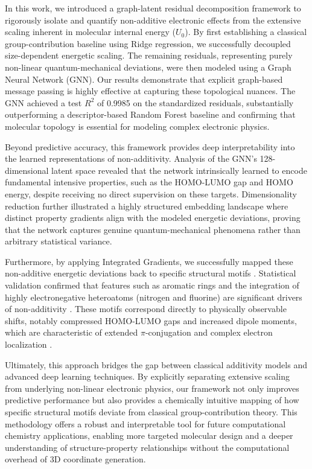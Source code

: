 \documentclass[]{article}
\begin{document}
In this work, we introduced a graph-latent residual decomposition framework to rigorously isolate and quantify non-additive electronic effects from the extensive scaling inherent in molecular internal energy ($U_0$). By first establishing a classical group-contribution baseline using Ridge regression, we successfully decoupled size-dependent energetic scaling. The remaining residuals, representing purely non-linear quantum-mechanical deviations, were then modeled using a Graph Neural Network (GNN). Our results demonstrate that explicit graph-based message passing is highly effective at capturing these topological nuances. The GNN achieved a test $R^2$ of 0.9985 on the standardized residuals, substantially outperforming a descriptor-based Random Forest baseline and confirming that molecular topology is essential for modeling complex electronic physics.

Beyond predictive accuracy, this framework provides deep interpretability into the learned representations of non-additivity. Analysis of the GNN's 128-dimensional latent space revealed that the network intrinsically learned to encode fundamental intensive properties, such as the HOMO-LUMO gap and HOMO energy, despite receiving no direct supervision on these targets. Dimensionality reduction further illustrated a highly structured embedding landscape where distinct property gradients align with the modeled energetic deviations, proving that the network captures genuine quantum-mechanical phenomena rather than arbitrary statistical variance.

Furthermore, by applying Integrated Gradients, we successfully mapped these non-additive energetic deviations back to specific structural motifs \citep{sundararajan2017axiomaticattributiondeepnetworks,polat2025xchemagentsagenticaiexplainable,ji2026molledgeradditivegraphneural}. Statistical validation confirmed that features such as aromatic rings and the integration of highly electronegative heteroatoms (nitrogen and fluorine) are significant drivers of non-additivity \citep{lundstrom2022rigorousstudyintegratedgradients,wang2026explainablemolecularpropertyprediction}. These motifs correspond directly to physically observable shifts, notably compressed HOMO-LUMO gaps and increased dipole moments, which are characteristic of extended $\pi$-conjugation and complex electron localization \citep{chen2026interpretablemachinelearningquantuminformed,mick2026datafusioncontrastivealignment,bigting2026martinimapperautomatedfragmentbased}.

Ultimately, this approach bridges the gap between classical additivity models and advanced deep learning techniques. By explicitly separating extensive scaling from underlying non-linear electronic physics, our framework not only improves predictive performance but also provides a chemically intuitive mapping of how specific structural motifs deviate from classical group-contribution theory. This methodology offers a robust and interpretable tool for future computational chemistry applications, enabling more targeted molecular design and a deeper understanding of structure-property relationships without the computational overhead of 3D coordinate generation.
\end{document}
